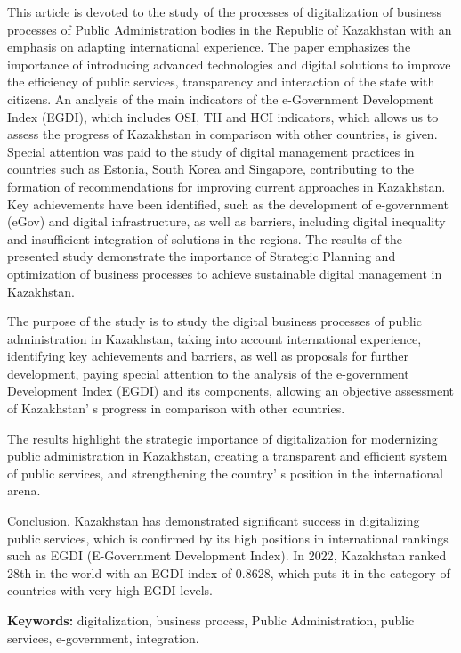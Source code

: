This article is devoted to the study of the processes of digitalization
of business processes of Public Administration bodies in the Republic of
Kazakhstan with an emphasis on adapting international experience. The
paper emphasizes the importance of introducing advanced technologies and
digital solutions to improve the efficiency of public services,
transparency and interaction of the state with citizens. An analysis of
the main indicators of the e-Government Development Index (EGDI), which
includes OSI, TII and HCI indicators, which allows us to assess the
progress of Kazakhstan in comparison with other countries, is given.
Special attention was paid to the study of digital management practices
in countries such as Estonia, South Korea and Singapore, contributing to
the formation of recommendations for improving current approaches in
Kazakhstan. Key achievements have been identified, such as the
development of e-government (eGov) and digital infrastructure, as well
as barriers, including digital inequality and insufficient integration
of solutions in the regions. The results of the presented study
demonstrate the importance of Strategic Planning and optimization of
business processes to achieve sustainable digital management in
Kazakhstan.

The purpose of the study is to study the digital business processes of
public administration in Kazakhstan, taking into account international
experience, identifying key achievements and barriers, as well as
proposals for further development, paying special attention to the
analysis of the e-government Development Index (EGDI) and its
components, allowing an objective assessment of
Kazakhstan' s progress in comparison with other
countries.

The results highlight the strategic importance of digitalization for
modernizing public administration in Kazakhstan, creating a transparent
and efficient system of public services, and strengthening the
country' s position in the international arena.

Conclusion. Kazakhstan has demonstrated significant success in
digitalizing public services, which is confirmed by its high positions
in international rankings such as EGDI (E-Government Development Index).
In 2022, Kazakhstan ranked 28th in the world with an EGDI index of
0.8628, which puts it in the category of countries with very high EGDI
levels.

{\bfseries Keywords:} digitalization, business process, Public
Administration, public services, e-government, integration.

